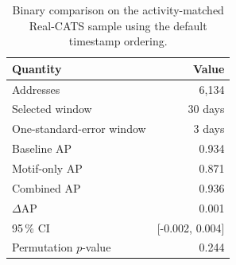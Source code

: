 \begin{table}[ht]
\centering
\caption{Binary comparison on the activity-matched Real-CATS sample using the default timestamp ordering.}
\label{tab:res_realcats_binary}
\footnotesize
\begin{tabular}{@{}l r@{}}
\toprule
\textbf{Quantity} & \textbf{Value} \\
\midrule
Addresses & 6,134 \\
Selected window & 30 days \\
One-standard-error window & 3 days \\
Baseline AP & 0.934 \\
Motif-only AP & 0.871 \\
Combined AP & 0.936 \\
$\Delta$AP & 0.001 \\
95\,\% CI & [-0.002, 0.004] \\
Permutation $p$-value & 0.244 \\
\bottomrule
\end{tabular}
\end{table}
